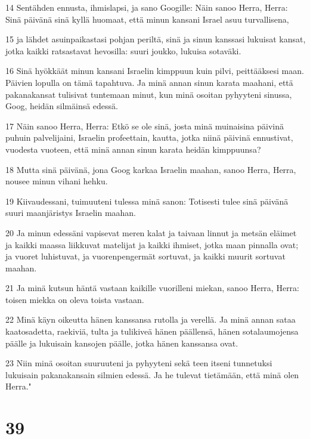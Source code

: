 \par 14 Sentähden ennusta, ihmislapsi, ja sano Googille: Näin sanoo Herra, Herra: Sinä päivänä sinä kyllä huomaat, että minun kansani Israel asuu turvallisena,
\par 15 ja lähdet asuinpaikastasi pohjan periltä, sinä ja sinun kanssasi lukuisat kansat, jotka kaikki ratsastavat hevosilla: suuri joukko, lukuisa sotaväki.
\par 16 Sinä hyökkäät minun kansani Israelin kimppuun kuin pilvi, peittääksesi maan. Päivien lopulla on tämä tapahtuva. Ja minä annan sinun karata maahani, että pakanakansat tulisivat tuntemaan minut, kun minä osoitan pyhyyteni sinussa, Goog, heidän silmäinsä edessä.
\par 17 Näin sanoo Herra, Herra: Etkö se ole sinä, josta minä muinaisina päivinä puhuin palvelijaini, Israelin profeettain, kautta, jotka niinä päivinä ennustivat, vuodesta vuoteen, että minä annan sinun karata heidän kimppuunsa?
\par 18 Mutta sinä päivänä, jona Goog karkaa Israelin maahan, sanoo Herra, Herra, nousee minun vihani hehku.
\par 19 Kiivaudessani, tuimuuteni tulessa minä sanon: Totisesti tulee sinä päivänä suuri maanjäristys Israelin maahan.
\par 20 Ja minun edessäni vapisevat meren kalat ja taivaan linnut ja metsän eläimet ja kaikki maassa liikkuvat matelijat ja kaikki ihmiset, jotka maan pinnalla ovat; ja vuoret luhistuvat, ja vuorenpengermät sortuvat, ja kaikki muurit sortuvat maahan.
\par 21 Ja minä kutsun häntä vastaan kaikille vuorilleni miekan, sanoo Herra, Herra: toisen miekka on oleva toista vastaan.
\par 22 Minä käyn oikeutta hänen kanssansa rutolla ja verellä. Ja minä annan sataa kaatosadetta, raekiviä, tulta ja tulikiveä hänen päällensä, hänen sotalaumojensa päälle ja lukuisain kansojen päälle, jotka hänen kanssansa ovat.
\par 23 Niin minä osoitan suuruuteni ja pyhyyteni sekä teen itseni tunnetuksi lukuisain pakanakansain silmien edessä. Ja he tulevat tietämään, että minä olen Herra."

\chapter{39}

